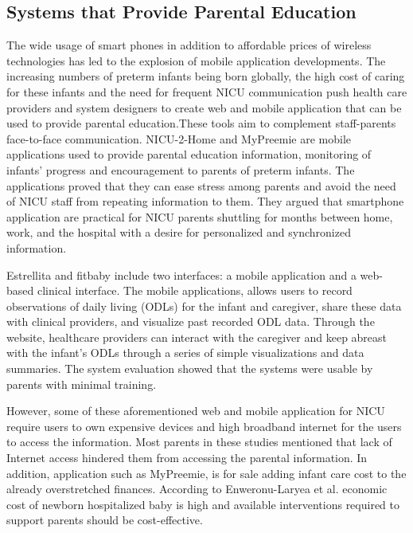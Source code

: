 \subsection{Systems that Provide Parental Education}
The wide usage of smart phones in addition to affordable prices of wireless technologies has led to the explosion of mobile application developments. The increasing numbers of preterm infants being born globally, the high cost of caring for these infants and the need for frequent NICU communication push health care providers and system designers to create web and mobile application that can be used to provide parental education.These tools aim to complement staff-parents face-to-face communication. NICU-2-Home \citep{Garfield2014} and MyPreemie \citep{Doron2013} are mobile applications used to provide parental education information, monitoring of infants' progress and encouragement to parents of preterm infants. The applications proved that they can ease stress among parents and avoid the need of NICU staff from repeating information to them. They argued that smartphone application are practical for NICU parents shuttling for months between home, work, and the hospital with a desire for personalized and synchronized information.

Estrellita \citep{Hayes2014} and fitbaby \citep{Hayes2010} include two interfaces: a mobile application and a web-based clinical interface. The mobile applications, allows users to record observations of daily living (ODLs) for the infant and caregiver, share these data with clinical providers, and visualize past recorded ODL data. Through the website, healthcare providers can interact with the caregiver and keep abreast with the infant’s ODLs through a series of simple visualizations and data summaries. The system evaluation showed that  the systems were usable by parents with minimal training.

However, some of these aforementioned web and mobile application for NICU require users to own expensive devices and high broadband internet for the users to access the information. Most parents in these studies mentioned that lack of Internet access hindered them from accessing the parental information.  In addition, application such as MyPreemie, is for sale adding infant care cost to the already overstretched finances. According to Enweronu-Laryea et al. \citep{Enweronu-Laryea2018} economic cost of newborn hospitalized baby is high and available interventions required to support parents should be cost-effective.

